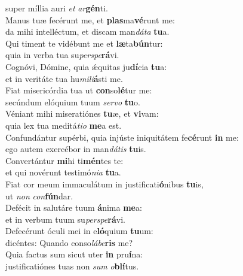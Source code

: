 \evenverse super míllia auri \textit{et} \textit{ar}\textbf{gén}ti.\\
\oddverse Manus tuæ fecérunt me, et \textbf{plas}ma\textbf{vé}runt me:~\*\\
\oddverse da mihi intelléctum, et discam man\textit{dá}\textit{ta} \textbf{tu}a.\\
\evenverse Qui timent te vidébunt me et \textbf{læ}ta\textbf{bún}tur:~\*\\
\evenverse quia in verba tua su\textit{per}\textit{spe}\textbf{rá}vi.\\
\oddverse Cognóvi, Dómine, quia ǽquitas ju\textbf{dí}cia \textbf{tu}a:~\*\\
\oddverse et in veritáte tua hu\textit{mi}\textit{li}\textbf{á}sti me.\\
\evenverse Fiat misericórdia tua ut \textbf{con}so\textbf{lé}tur me:~\*\\
\evenverse secúndum elóquium tuum \textit{ser}\textit{vo} \textbf{tu}o.\\
\oddverse Véniant mihi miseratiónes \textbf{tu}æ, et \textbf{vi}vam:~\*\\
\oddverse quia lex tua meditá\textit{ti}\textit{o} \textbf{me}a est.\\
\evenverse Confundántur supérbi, quia injúste iniquitátem fe\textbf{cé}runt \textbf{in} me:~\*\\
\evenverse ego autem exercébor in man\textit{dá}\textit{tis} \textbf{tu}is.\\
\oddverse Convertántur \textbf{mi}hi ti\textbf{mén}tes te:~\*\\
\oddverse et qui novérunt testimó\textit{ni}\textit{a} \textbf{tu}a.\\
\evenverse Fiat cor meum immaculátum in justificati\textbf{ó}nibus \textbf{tu}is,~\*\\
\evenverse ut \textit{non} \textit{con}\textbf{fún}dar.\\
\oddverse Defécit in salutáre tuum \textbf{á}nima \textbf{me}a:~\*\\
\oddverse et in verbum tuum su\textit{per}\textit{spe}\textbf{rá}vi.\\
\evenverse Defecérunt óculi mei in e\textbf{ló}quium \textbf{tu}um:~\*\\
\evenverse dicéntes: Quando conso\textit{lá}\textit{be}\textbf{ris} me?\\
\oddverse Quia factus sum sicut uter \textbf{in} pru\textbf{í}na:~\*\\
\oddverse justificatiónes tuas non \textit{sum} \textit{o}\textbf{blí}tus.\\

